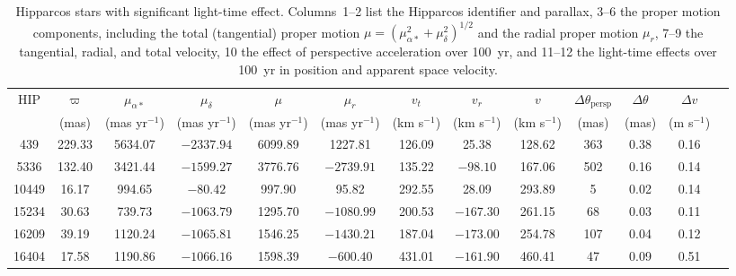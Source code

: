 \documentclass{aa}
\begin{document}
\begin{table}
 \caption{Hipparcos stars with significant light-time effect. Columns~1--2 list the
 Hipparcos identifier and parallax, 3--6 the proper motion components,
 including the total (tangential) proper motion $\mu=(\mu_{\alpha*}^2+\mu_\delta^2)^{1/2}$
 and the radial proper motion $\mu_r$, 7--9 the tangential, radial, and total
 velocity, 10 the effect of perspective acceleration over 100~yr, and 11--12
 the light-time effects over 100~yr in position and apparent space velocity.}
 \label{table:1}
 \centering\footnotesize
 \begin{tabular}{ccccccccccccc}
 \hline\hline
 \noalign{\smallskip}
 HIP & $\varpi$ & $\mu_{\alpha*}$ & $\mu_\delta$ & $\mu$ & $\mu_r$         & $v_t$ & $v_r$         & $v$ & $\Delta\theta_\mathrm{persp}$ & $\Delta\theta$ & $\Delta v$ \\
     & (mas)    & (mas yr$^{-1}$) & (mas yr$^{-1}$) & (mas yr$^{-1}$) & (mas yr$^{-1}$) & (km s$^{-1}$) & (km s$^{-1}$) & (km s$^{-1}$) & (mas) & (mas) & (m s$^{-1}$) \\
 \noalign{\smallskip}
 \hline
 \noalign{\smallskip}
\phantom{111}439 &  229.33 & \phantom{1}5634.07 & $-2337.94$ & \phantom{1}6099.89 & \phantom{11}1227.81 & 126.09 & \phantom{11}25.38 &  128.62            & \phantom{1}363 &    0.38 &    0.16 \\
\phantom{11}5336 &  132.40 & \phantom{1}3421.44 & $-1599.27$ & \phantom{1}3776.76 & \phantom{1}$-2739.91$ & 135.22 & \phantom{1}$-98.10$ &  167.06        & \phantom{1}502 &    0.16 &    0.14 \\
\phantom{1}10449 & \phantom{1}16.17 & \phantom{11}994.65 & \phantom{11}$-80.42$ & \phantom{11}997.90 & \phantom{1111}95.82 & 292.55 & \phantom{11}28.09 &  293.89 & \phantom{111}5 &    0.02 &    0.14 \\
\phantom{1}15234 & \phantom{1}30.63 & \phantom{11}739.73 & $-1063.79$ & \phantom{1}1295.70 & \phantom{1}$-1080.99$ & 200.53 & $-167.30$ &  261.15                 & \phantom{11}68 &    0.03 &    0.11 \\
\phantom{1}16209 & \phantom{1}39.19 & \phantom{1}1120.24 & $-1065.81$ & \phantom{1}1546.25 & \phantom{1}$-1430.21$ & 187.04 & $-173.00$ &  254.78                 & \phantom{1}107 &    0.04 &    0.12 \\
 \noalign{\smallskip}
\phantom{1}16404 & \phantom{1}17.58 & \phantom{1}1190.86 & $-1066.16$ & \phantom{1}1598.39 & \phantom{11}$-600.40$ & 431.01 & $-161.90$ &  460.41                 & \phantom{11}47 &    0.09 &    0.51 \\

\end{tabular}
\end{table}
\end{document}
